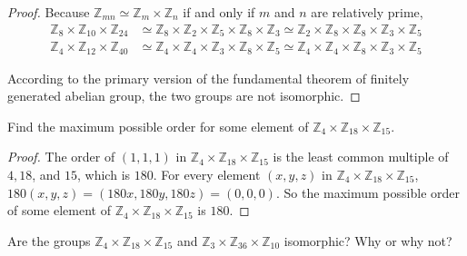 \begin{proof}
    Because $\mathbb{Z}_{mn}\simeq \mathbb{Z}_{m}\times\mathbb{Z}_{n}$ if and only if $m$ and $n$ are relatively prime,
    \begin{align*}
        \mathbb{Z}_{8}\times\mathbb{Z}_{10}\times\mathbb{Z}_{24} & \simeq \mathbb{Z}_{8}\times\mathbb{Z}_{2}\times\mathbb{Z}_{5}\times\mathbb{Z}_{8}\times\mathbb{Z}_{3} \simeq \mathbb{Z}_{2}\times\mathbb{Z}_{8}\times\mathbb{Z}_{8}\times\mathbb{Z}_{3}\times\mathbb{Z}_{5} \\
        \mathbb{Z}_{4}\times\mathbb{Z}_{12}\times\mathbb{Z}_{40} & \simeq \mathbb{Z}_{4}\times\mathbb{Z}_{4}\times\mathbb{Z}_{3}\times\mathbb{Z}_{8}\times\mathbb{Z}_{5} \simeq \mathbb{Z}_{4}\times\mathbb{Z}_{4}\times\mathbb{Z}_{8}\times\mathbb{Z}_{3}\times\mathbb{Z}_{5}
    \end{align*}

    According to the primary version of the fundamental theorem of finitely generated abelian group, the two groups are not isomorphic.
\end{proof}

\newpage
\begin{exercise}
    Find the maximum possible order for some element of $\mathbb{Z}_{4}\times\mathbb{Z}_{18}\times\mathbb{Z}_{15}$.
\end{exercise}

\begin{proof}
    The order of $(1,1,1)$ in $\mathbb{Z}_{4}\times\mathbb{Z}_{18}\times\mathbb{Z}_{15}$ is the least common multiple of $4,18$, and $15$, which is $180$. For every element $(x,y,z)$ in $\mathbb{Z}_{4}\times\mathbb{Z}_{18}\times\mathbb{Z}_{15}$, $180(x,y,z) = (180x,180y,180z) = (0,0,0)$. So the maximum possible order of some element of $\mathbb{Z}_{4}\times\mathbb{Z}_{18}\times\mathbb{Z}_{15}$ is $180$.
\end{proof}

\newpage
\begin{exercise}
    Are the groups $\mathbb{Z}_{4}\times\mathbb{Z}_{18}\times\mathbb{Z}_{15}$ and $\mathbb{Z}_{3}\times\mathbb{Z}_{36}\times\mathbb{Z}_{10}$ isomorphic? Why or why not?
\end{exercise}


